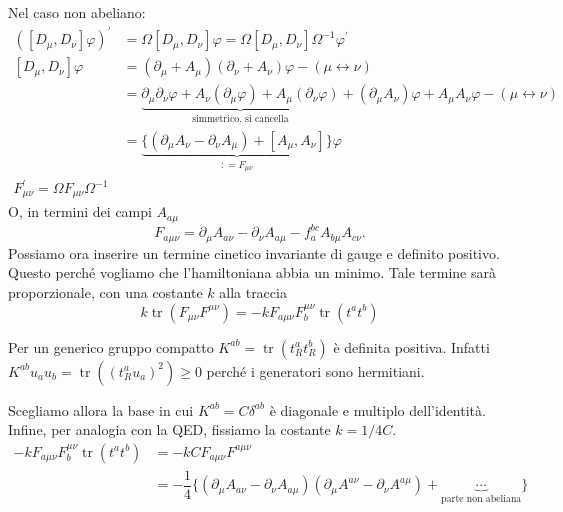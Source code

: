 \documentclass[italian,a4paper]{article}
\theoremstyle{definition}
\DeclareMathOperator{\tr}{tr}
\newcommand{\dimu}{\ensuremath{\partial_{\mu}}}
\newcommand{\Dimu}{\ensuremath{D_{\mu}}}
\newcommand{\dinu}{\ensuremath{\partial_{\nu}}}
\newcommand{\Dinu}{\ensuremath{D_{\nu}}}
\begin{document}
\begin{enumerate}
        Nel caso non abeliano:
        \begin{align*}
            ([\Dimu, \Dinu]\varphi)^\prime &= \Omega [\Dimu, \Dinu]\varphi = \Omega [\Dimu, \Dinu]
            \Omega^{-1}\varphi^\prime\\
            [\Dimu, \Dinu]\varphi &= (\dimu + A_\mu)(\dinu + A_\nu) \varphi -
            (\mu \leftrightarrow \nu)\\
            &= \underbrace{\dimu \dinu \varphi + A_\nu(\dimu \varphi) + A_\mu(\dinu
            \varphi)}_{\text{simmetrico, si cancella}} + (\dimu A_\nu)\varphi + A_\mu
            A_\nu \varphi - (\mu \leftrightarrow \nu)\\
            &= \underbrace{\{ (\dimu A_\nu - \dinu A_\mu) + [A_\mu, A_\nu]
            \}}_{\mathop{:}= F_{\mu\nu}} \varphi\\
            F_{\mu\nu}^\prime = \Omega F_{\mu\nu} \Omega^{-1}
        \end{align*}
        O, in termini dei campi $A_{a\mu}$
        \begin{equation}
            F_{a\mu\nu} = \dimu A_{a\nu} - \dinu A_{a\mu} - f^{bc}_a
            A_{b\mu}A_{c\nu}.
            \label{eq:fmunu}
        \end{equation}
        Possiamo ora inserire un termine cinetico invariante di gauge e
        definito positivo. Questo perch\'e vogliamo che l'hamiltoniana abbia
        un minimo. Tale termine sar\`a proporzionale, con una costante
        $k$ alla traccia
        \begin{equation*}
            k \tr(F_{\mu\nu}F^{\mu\nu}) = -k F_{a\mu\nu}F^{\mu\nu}_b \tr(t^a
            t^b)
        \end{equation*}
        
        Per un generico gruppo compatto $K^{ab} = \tr(t^a_R t^b_R)$
        \`e definita positiva. Infatti $K^{ab}u_a u_b = \tr( (t^a_R u_a)^2)
        \geq 0$ perch\'e i generatori sono hermitiani.

        Scegliamo allora la base in cui $K^{ab} = C\delta^{ab}$ \`e diagonale e multiplo
        dell'identit\`a. Infine, per analogia con la QED, fissiamo la
        costante $k = 1/4C$.
        \begin{align*}
            -k F_{a\mu\nu}F^{\mu\nu}_b \tr(t^a t^b) &= -kC
            F_{a\mu\nu}F^{a\mu\nu}\\
            &= -\dfrac{1}{4}\{ (\dimu A_{a\nu} - \dinu A_{a\mu})
            (\dimu A^{a\nu} - \dinu A^{a\mu}) + \underbrace{\cdots}_{\text{parte non
            abeliana}}\}
        \end{align*}
\end{enumerate}
\end{document}
